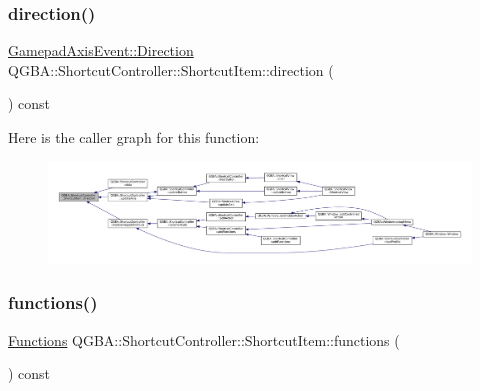 \subsubsection{\texorpdfstring{direction()}{direction()}}
{\footnotesize\ttfamily \mbox{\hyperlink{class_q_g_b_a_1_1_gamepad_axis_event_a5d50ab74dce4e58252f2affb5f227bbc}{Gamepad\+Axis\+Event\+::\+Direction}} Q\+G\+B\+A\+::\+Shortcut\+Controller\+::\+Shortcut\+Item\+::direction (\begin{DoxyParamCaption}{ }\end{DoxyParamCaption}) const\hspace{0.3cm}{\ttfamily [inline]}}

Here is the caller graph for this function\+:
\nopagebreak
\begin{figure}[H]
\begin{center}
\leavevmode
\includegraphics[width=350pt]{class_q_g_b_a_1_1_shortcut_controller_1_1_shortcut_item_a4f59fb8b2d637d66a49cc58dc8b6007f_icgraph}
\end{center}
\end{figure}
\mbox{\label{class_q_g_b_a_1_1_shortcut_controller_1_1_shortcut_item_aa542632ee6a4bcfc84eac410da7a00a9}} 
\subsubsection{\texorpdfstring{functions()}{functions()}}
{\footnotesize\ttfamily \mbox{\hyperlink{class_q_g_b_a_1_1_shortcut_controller_1_1_shortcut_item_a28ffcf4fe5bf253d0d47e2357794ddf1}{Functions}} Q\+G\+B\+A\+::\+Shortcut\+Controller\+::\+Shortcut\+Item\+::functions (\begin{DoxyParamCaption}{ }\end{DoxyParamCaption}) const\hspace{0.3cm}{\ttfamily [inline]}}

